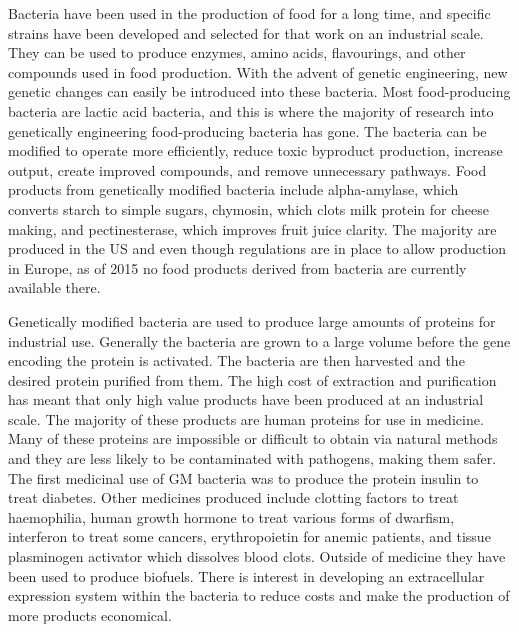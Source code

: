 Bacteria have been used in the production of food for a long time, and specific strains have been developed and selected for that work on an industrial scale. They can be used to produce enzymes, amino acids, flavourings, and other compounds used in food production. With the advent of genetic engineering, new genetic changes can easily be introduced into these bacteria. Most food-producing bacteria are lactic acid bacteria, and this is where the majority of research into genetically engineering food-producing bacteria has gone. The bacteria can be modified to operate more efficiently, reduce toxic byproduct production, increase output, create improved compounds, and remove unnecessary pathways. Food products from genetically modified bacteria include alpha-amylase, which converts starch to simple sugars, chymosin, which clots milk protein for cheese making, and pectinesterase, which improves fruit juice clarity. The majority are produced in the US and even though regulations are in place to allow production in Europe, as of 2015 no food products derived from bacteria are currently available there.

Genetically modified bacteria are used to produce large amounts of proteins for industrial use. Generally the bacteria are grown to a large volume before the gene encoding the protein is activated. The bacteria are then harvested and the desired protein purified from them. The high cost of extraction and purification has meant that only high value products have been produced at an industrial scale. The majority of these products are human proteins for use in medicine. Many of these proteins are impossible or difficult to obtain via natural methods and they are less likely to be contaminated with pathogens, making them safer. The first medicinal use of GM bacteria was to produce the protein insulin to treat diabetes. Other medicines produced include clotting factors to treat haemophilia, human growth hormone to treat various forms of dwarfism, interferon to treat some cancers, erythropoietin for anemic patients, and tissue plasminogen activator which dissolves blood clots. Outside of medicine they have been used to produce biofuels. There is interest in developing an extracellular expression system within the bacteria to reduce costs and make the production of more products economical.

